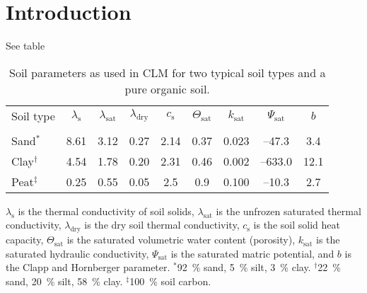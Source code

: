 
\section{Introduction}


\lipsum[15] See table 



\begin{table}[h!tb]
\caption{Soil parameters as used in CLM for two typical soil types and a pure organic soil. \label{tab:SoilParam}}
{
\centering
\begin{tabular}{l c c c c c c c c}
\toprule
Soil type & $\lambda_{\text{s}}$ & $\lambda_{\text{sat}}$ & $\lambda_{\text{dry}}$ & $c_{\text{s}}$ & $\Theta_{\text{sat}}$ & $k_{\text{sat}}$ & $\Psi_{\text{sat}}$ & $b$ \\
& \multicolumn{3}{c}{\capunit{\watt}} &\capunit{\giga\joule\per\meter\cubed\per\kelvin }&\capunit{-}&\capunit{\milli\meter\per\second}&\capunit{\milli\meter}&\capunit{-} \\
\midrule
Sand$^*$  & 8.61 & 3.12 & 0.27 & 2.14 & 0.37 & 0.023 & –47.3 & 3.4 \\
Clay$^\dag$ & 4.54 & 1.78 & 0.20 & 2.31 & 0.46 & 0.002 & –633.0 & 12.1 \\
Peat$^\ddag$ & 0.25 & 0.55 & 0.05 & 2.5 & 0.9 & 0.100 & –10.3 & 2.7 \\
\bottomrule
\end{tabular}

} %

\footnotesize{\vspace*{1ex}$\lambda_{\text{s}}$ is the thermal conductivity of soil solids, $\lambda_{\text{sat}}$ is the unfrozen saturated thermal conductivity, $\lambda_{\text{dry}}$ is the dry soil thermal conductivity, $c_{\text{s}}$ is the soil solid heat capacity, $\Theta_{\text{sat}}$ is the saturated volumetric water content (porosity), $k_{\text{sat}}$ is the saturated hydraulic conductivity, $\Psi_{\text{sat}}$ is the saturated matric potential, and $b$ is the Clapp and Hornberger parameter.
$^*$\SI{92}{\percent} sand, \SI{5}{\percent} silt, \SI{3}{\percent} clay. $^\dag$\SI{22}{\percent} sand, \SI{20}{\percent} silt, \SI{58}{\percent} clay. $^\ddag$\SI{100}{\percent} soil carbon.}

\end{table}


\lipsum[16]

